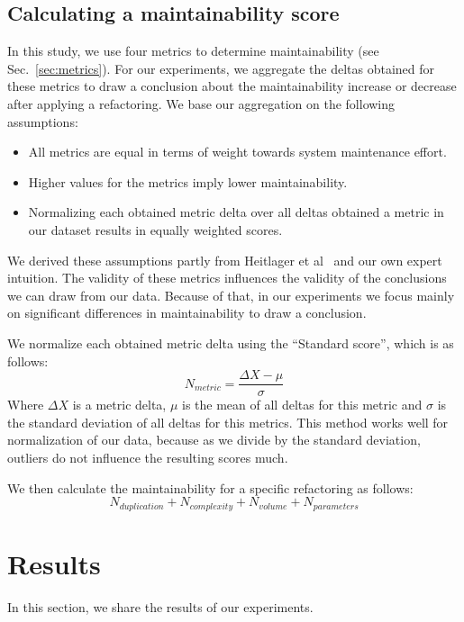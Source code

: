 \documentclass[sigconf,review, table]{acmart}
\begin{document}
\subsection{Calculating a maintainability score}\label{sec:metricformula}
In this study, we use four metrics to determine maintainability (see Sec.~\ref{sec:metrics}). For our experiments, we aggregate the deltas obtained for these metrics to draw a conclusion about the maintainability increase or decrease after applying a refactoring. We base our aggregation on the following assumptions:
\begin{itemize}
  \item All metrics are equal in terms of weight towards system maintenance effort.
  \item Higher values for the metrics imply lower maintainability.
  \item Normalizing each obtained metric delta over all deltas obtained a metric in our dataset results in equally weighted scores.
\end{itemize}
We derived these assumptions partly from Heitlager et al~\cite{heitlager2007practical} and our own expert intuition. The validity of these metrics influences the validity of the conclusions we can draw from our data. Because of that, in our experiments we focus mainly on significant differences in maintainability to draw a conclusion.

We normalize each obtained metric delta using the ``Standard score'', which is as follows:
\begin{equation}\label{eq:scoredev}
N_{metric} = \frac {\Delta X-\mu}{\sigma}
\end{equation}
Where $\Delta X$ is a metric delta, $\mu$ is the mean of all deltas for this metric and $\sigma$ is the standard deviation of all deltas for this metrics. This method works well for normalization of our data, because as we divide by the standard deviation, outliers do not influence the resulting scores much.

We then calculate the maintainability for a specific refactoring as follows:
\begin{equation}\label{eq:scoreref}
N_{duplication} + N_{complexity} + N_{volume} + N_{parameters}
\end{equation}

\section{Results}
In this section, we share the results of our experiments.
\end{document}
